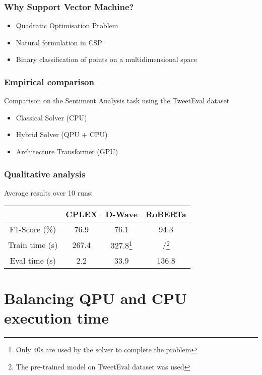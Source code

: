 \documentclass[aspectratio=169]{beamer}
\begin{document}
\begin{frame}\frametitle{Why Support Vector Machine?}

    \begin{itemize}
        \item Quadratic Optimisation Problem
        \item Natural formulation in CSP
        \item Binary classification of points on a multidimensional space
    \end{itemize}

\end{frame}

\begin{frame}\frametitle{Empirical comparison}

    Comparison on the Sentiment Analysis task using the TweetEval dataset

    \begin{itemize}
        \item Classical Solver (CPU)
        \item Hybrid Solver (QPU + CPU)
        \item Architecture Transformer (GPU)
    \end{itemize}

\end{frame}

\begin{frame}\frametitle{Qualitative analysis}

    Average results over 10 runs:

    \begin{table}
        \centering
        \begin{tabular}{c|c|c|c}
            & CPLEX & D-Wave & RoBERTa \\ \hline
            F1-Score (\%) & 76.9 & 76.1 & 94.3 \\ \hline
            Train time (s) & 267.4 & 327.8\footnote{Only 40s are used by the solver to complete the problem} & /\footnote{The pre-trained model on TweetEval dataset was used} \\ \hline
            Eval time (s) & 2.2 & 33.9 & 136.8
        \end{tabular}
    \end{table}

\end{frame}

\section{Balancing QPU and CPU \\execution time}
\end{document}

